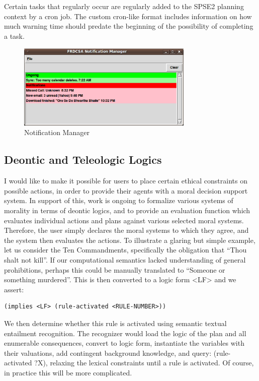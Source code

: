 \documentclass[letterpaper]{article}
\begin{document}
Certain tasks that regularly occur are regularly added to the SPSE2
planning context by a cron job.  The custom cron-like format includes
information on how much warning time should predate the beginning of
the possibility of completing a task.

\begin{figure}[h!]
  \centering
  \includegraphics[width=84mm]{images/ps/notification-manager.ps}
  \caption{Notification Manager}
\end{figure}

\subsection{Deontic and Teleologic Logics}

\noindent I would like to make it possible for users to place certain
ethical constraints on possible actions, in order to provide their
agents with a moral decision support system.  In support of this, work
is ongoing to formalize various systems of morality in terms of
deontic logics, and to provide an evaluation function which evaluates
individual actions and plans against various selected moral systems.
Therefore, the user simply declares the moral systems to which they
agree, and the system then evaluates the actions.  To illustrate a
glaring but simple example, let us consider the Ten Commandments,
specifically the obligation that ``Thou shalt not kill''.  If our
computational semantics lacked understanding of general prohibitions,
perhaps this could be manually translated to ``Someone or something
murdered''.  This is then converted to a logic form <LF> and we
assert:

\begin{footnotesize}
\begin{verbatim}
(implies <LF> (rule-activated <RULE-NUMBER>))
\end{verbatim}
\end{footnotesize}

We then determine whether this rule is activated using semantic
textual entailment recognition.  The recognizer would load the logic
of the plan and all enumerable consequences, convert to logic form,
instantiate the variables with their valuations, add contingent
background knowledge, and query: (rule-activated ?X), relaxing the
lexical constraints until a rule is activated.  Of course, in practice
this will be more complicated.
\end{document}
